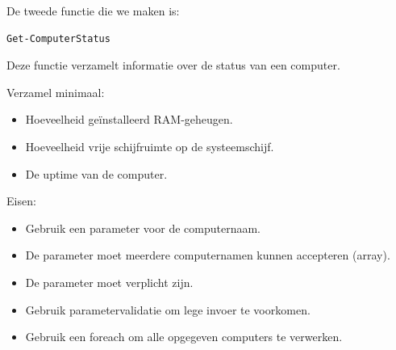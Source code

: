 De tweede functie die we maken is:
\begin{lstlisting}[language=bash]
Get-ComputerStatus
\end{lstlisting}
Deze functie verzamelt informatie over de status van een computer.

Verzamel minimaal:
\begin{itemize}
\item Hoeveelheid geïnstalleerd RAM-geheugen.
\item Hoeveelheid vrije schijfruimte op de systeemschijf.
\item De uptime van de computer.
\end{itemize}

Eisen:
\begin{itemize}
\item Gebruik een parameter voor de computernaam.
\item De parameter moet meerdere computernamen kunnen accepteren (array).
\item De parameter moet verplicht zijn.
\item Gebruik parametervalidatie om lege invoer te voorkomen.
\item Gebruik een foreach om alle opgegeven computers te verwerken.
\end{itemize}

